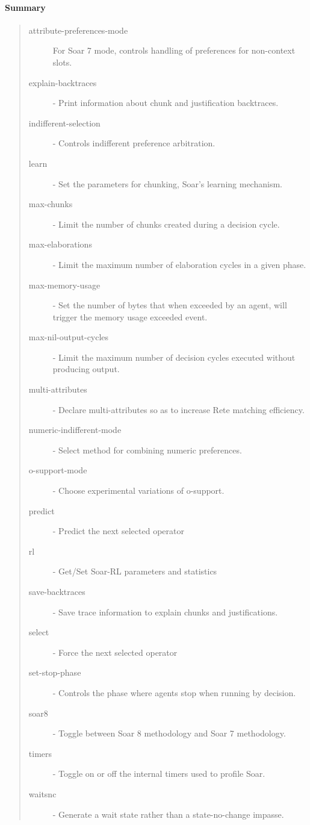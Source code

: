 \paragraph{Summary}
\begin{quote}
\begin{description}
\item[attribute-preferences-mode] For Soar 7 mode, controls handling of preferences for non-context slots.
\item[explain-backtraces] - Print information about chunk and justification backtraces.
\item[indifferent-selection] -  Controls indifferent preference arbitration.
\item[learn] - Set the parameters for chunking, Soar's learning mechanism.
\item[max-chunks] - Limit the number of chunks created during a decision cycle.
\item[max-elaborations] - Limit the maximum number of elaboration cycles in a given phase.
\item[max-memory-usage] - Set the number of bytes that when exceeded by an agent, will trigger the memory usage exceeded event. 
\item[max-nil-output-cycles] - Limit the maximum number of decision cycles executed without producing output. 
\item[multi-attributes] - Declare multi-attributes so as to increase Rete matching efficiency.
\item[numeric-indifferent-mode] - Select method for combining numeric preferences.
\item[o-support-mode] - Choose experimental variations of o-support.
\item[predict] - Predict the next selected operator 
\item[rl] - Get/Set Soar-RL parameters and statistics 
\item[save-backtraces] - Save trace information to explain chunks and justifications.
\item[select] - Force the next selected operator 
\item[set-stop-phase] -  Controls the phase where agents stop when running by decision.
\item[soar8] - Toggle between Soar 8 methodology and Soar 7 methodology.
\item[timers] - Toggle on or off the internal timers used to profile Soar.
\item[waitsnc] - Generate a wait state rather than a state-no-change impasse.
\end{description}
\end{quote}

